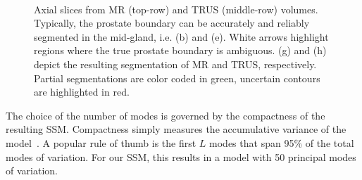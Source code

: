 \documentclass[journal]{IEEEtran}
\begin{document}
\begin{figure}[t]
	\\
	\hfill
  \caption{Axial slices from MR (top-row) and TRUS (middle-row) volumes. Typically, the prostate boundary can be accurately and reliably segmented in the mid-gland, i.e. (b) and (e). White arrows highlight regions where the true prostate boundary is ambiguous. (g) and (h) depict the resulting segmentation of MR and TRUS, respectively. Partial segmentations are color coded in green, uncertain contours are highlighted in red.}\label{fig:biopsy1}
\end{figure}

The choice of the number of modes is governed by the compactness of the resulting SSM. Compactness simply measures the accumulative variance of the model~\cite{Heimann09a}. A popular rule of thumb is the first $L$ modes that span 95\% of the total modes of variation. For our SSM, this results in a model with 50 principal modes of variation.
\end{document}
